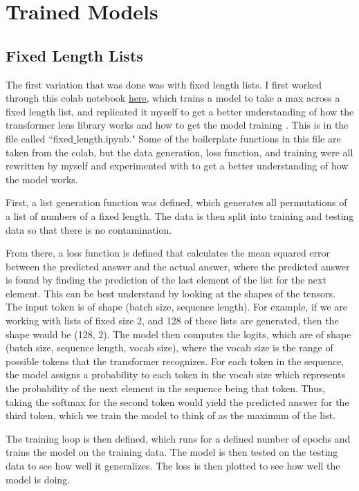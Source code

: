 \documentclass{article}
\begin{document}
\section{Trained Models}

\subsection{Fixed Length Lists}

The first variation that was done was with fixed length lists. I first worked through this colab notebook \href{https://colab.research.google.com/drive/1N4iPEyBVuctveCA0Zre92SpfgH6nmHXY}{here}, which trains a model to take a max across a fixed length list, and replicated it myself to get a better understanding of how the transformer lens library works and how to get the model training \cite{8}. This is in the file called ``fixed$\_$length.ipynb." Some of the boilerplate functions in this file are taken from the colab, but the data generation, loss function, and training were all rewritten by myself and experimented with to get a better understanding of how the model works.

First, a list generation function was defined, which generates all permutations of a list of numbers of a fixed length. The data is then split into training and testing data so that there is no contamination. 

From there, a loss function is defined that calculates the mean squared error between the predicted answer and the actual answer, where the predicted answer is found by finding the prediction of the last element of the list for the next element. This can be best understand by looking at the shapes of the tensors. The input token is of shape (batch size, sequence length). For example, if we are working with lists of fixed size 2, and 128 of these lists are generated, then the shape would be (128, 2). The model then computes the logits, which are of shape (batch size, sequence length, vocab size), where the vocab size is the range of possible tokens that the transformer recognizes. For each token in the sequence, the model assigns a probability to each token in the vocab size which represents the probability of the next element in the sequence being that token. Thus, taking the softmax for the second token would yield the predicted answer for the third token, which we train the model to think of as the maximum of the list.

The training loop is then defined, which runs for a defined number of epochs and trains the model on the training data. The model is then tested on the testing data to see how well it generalizes. The loss is then plotted to see how well the model is doing.
\end{document}
